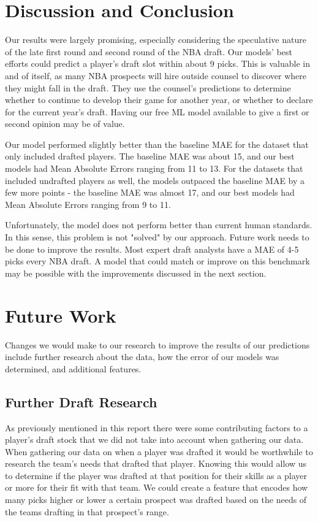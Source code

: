 \documentclass{article}
\begin{document}
\section{Discussion and Conclusion}

Our results were largely promising, especially considering the speculative
nature of the late first round and second round of the NBA draft. Our models'
best efforts could predict a player's draft slot within about 9 picks. This is
valuable in and of itself, as many NBA prospects will hire outside counsel to
discover where they might fall in the draft. They use the counsel's predictions
to determine whether to continue to develop their game for another year, or
whether to declare for the current year's draft. Having our free ML model
available to give a first or second opinion may be of value.

Our model performed slightly better than the baseline MAE for the dataset that
only included drafted players. The baseline MAE was about 15, and our best
models had Mean Absolute Errors ranging from 11 to 13. For the datasets that
included undrafted players as well, the models outpaced the baseline MAE by a
few more points - the baseline MAE was almost 17, and our best models had Mean
Absolute Errors ranging from 9 to 11.

Unfortunately, the model does not perform better than current human standards.
In this sense, this problem is not "solved" by our approach. Future work needs
to be done to improve the results. Most expert draft analysts have a MAE of 4-5
picks every NBA draft. A model that could match or improve on this benchmark may
be possible with the improvements discussed in the next section.

\section{Future Work}

Changes we would make to our research to improve the results of our predictions
include further research about the data, how the error of our models was
determined, and additional features.

\subsection{Further Draft Research}

As previously mentioned in this report there were some contributing factors to a
player’s draft stock that we did not take into account when gathering our data.
When gathering our data on when a player was drafted it would be worthwhile to
research the team’s needs that drafted that player. Knowing this would allow us
to determine if the player was drafted at that position for their skills as a
player or more for their fit with that team. We could create a feature that
encodes how many picks higher or lower a certain prospect was drafted based on
the needs of the teams drafting in that prospect's range.
\end{document}
